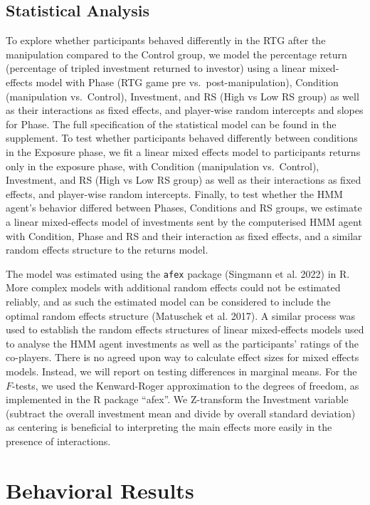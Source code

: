 \documentclass[
]{article}
\begin{document}
\subsection{Statistical Analysis}\label{statistical-analysis}

To explore whether participants behaved differently in the RTG after the manipulation compared to the Control group, we model the percentage return (percentage of tripled investment returned to investor) using a linear mixed-effects model with Phase (RTG game pre vs.~post-manipulation), Condition (manipulation vs.~Control), Investment, and RS (High vs Low RS group) as well as their interactions as fixed effects, and player-wise random intercepts and slopes for Phase. The full specification of the statistical model can be found in the supplement. To test whether participants behaved differently between conditions in the Exposure phase, we fit a linear mixed effects model to participants returns only in the exposure phase, with Condition (manipulation vs.~Control), Investment, and RS (High vs Low RS group) as well as their interactions as fixed effects, and player-wise random intercepts. Finally, to test whether the HMM agent's behavior differed between Phases, Conditions and RS groups, we estimate a linear mixed-effects model of investments sent by the computerised HMM agent with Condition, Phase and RS and their interaction as fixed effects, and a similar random effects structure to the returns model.

The model was estimated using the \texttt{afex} package (Singmann et al. 2022) in R. More complex models with additional random effects could not be estimated reliably, and as such the estimated model can be considered to include the optimal random effects structure (Matuschek et al. 2017). A similar process was used to establish the random effects structures of linear mixed-effects models used to analyse the HMM agent investments as well as the participants' ratings of the co-players. There is no agreed upon way to calculate effect sizes for mixed effects models. Instead, we will report on testing differences in marginal means. For the \(F\)-tests, we used the Kenward-Roger approximation to the degrees of freedom, as implemented in the R package ``afex''. We Z-transform the Investment variable (subtract the overall investment mean and divide by overall standard deviation) as centering is beneficial to interpreting the main effects more easily in the presence of interactions.

\section{Behavioral Results}\label{behavioral-results}
\end{document}
